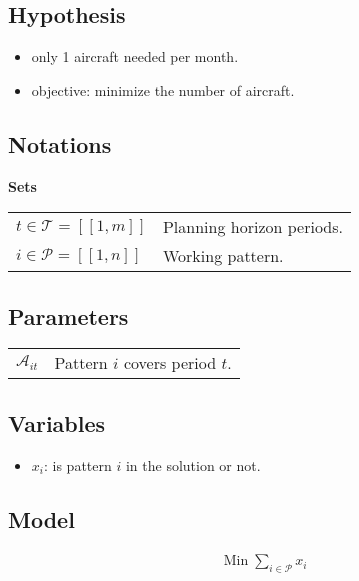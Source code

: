 \documentclass[a4paper,11pt]{article}
\begin{document}
    \subsection{Hypothesis}

    \begin{itemize}
     \item only 1 aircraft needed per month.
     \item objective: minimize the number of aircraft.
    \end{itemize}

    \subsection{Notations}

    \textbf{Sets}

    \begin{tabular}{ll}
    $t\in \mathcal{T} = [\![1, m]\!]$ & Planning horizon periods. \\
    $i \in \mathcal{P} = [\![1, n]\!]$ & Working pattern.\\
    \end{tabular}

    \vskip 0.3cm

    \subsection{Parameters}

    \begin{tabular}{ll}
        $\mathcal{A}_{it}$ & Pattern $i$ covers period $t$.\\
    \end{tabular}

    \vskip 0.3cm

    \subsection{Variables}

    \begin{itemize}
     \item $x_i$: is pattern $i$ in the solution or not.
    \end{itemize}

    \subsection{Model}

    \begin{align}
        & \text{Min}\; \sum_{i \in \mathcal{P}} x_i
    \end{align}
\end{document}
